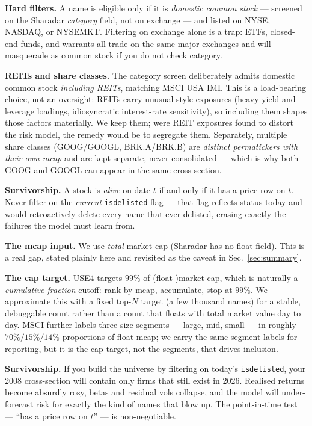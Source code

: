 \documentclass[11pt]{article}
\theoremstyle{definition}
\theoremstyle{plain}
\theoremstyle{remark}
\begin{document}
\textbf{Hard filters.} A name is eligible only if it is \emph{domestic common stock} --- screened on the Sharadar \emph{category} field, not on exchange --- and listed on NYSE, NASDAQ, or NYSEMKT. Filtering on exchange alone is a trap: ETFs, closed-end funds, and warrants all trade on the same major exchanges and will masquerade as common stock if you do not check category.

\textbf{REITs and share classes.} The category screen deliberately admits domestic common stock \emph{including REITs}, matching MSCI USA IMI. This is a load-bearing choice, not an oversight: REITs carry unusual style exposures (heavy yield and leverage loadings, idiosyncratic interest-rate sensitivity), so including them shapes those factors materially. We keep them; were REIT exposures found to distort the risk model, the remedy would be to segregate them. Separately, multiple share classes (GOOG/GOOGL, BRK.A/BRK.B) are \emph{distinct permatickers with their own mcap} and are kept separate, never consolidated --- which is why both GOOG and GOOGL can appear in the same cross-section.

\textbf{Survivorship.} A stock is \emph{alive} on date $t$ if and only if it has a price row on $t$. Never filter on the \emph{current} \texttt{isdelisted} flag --- that flag reflects status today and would retroactively delete every name that ever delisted, erasing exactly the failures the model must learn from.

\textbf{The mcap input.} We use \emph{total} market cap (Sharadar has no float field). This is a real gap, stated plainly here and revisited as the caveat in Sec.\ \ref{sec:summary}.

\textbf{The cap target.} USE4 targets $99\%$ of (float-)market cap, which is naturally a \emph{cumulative-fraction} cutoff: rank by mcap, accumulate, stop at $99\%$. We approximate this with a fixed top-$N$ target (a few thousand names) for a stable, debuggable count rather than a count that floats with total market value day to day. MSCI further labels three size segments --- large, mid, small --- in roughly $70\%/15\%/14\%$ proportions of float mcap; we carry the same segment labels for reporting, but it is the cap target, not the segments, that drives inclusion.

\begin{pitfall}
\textbf{Survivorship.} If you build the universe by filtering on today's \texttt{isdelisted}, your 2008 cross-section will contain only firms that still exist in 2026. Realised returns become absurdly rosy, betas and residual vols collapse, and the model will under-forecast risk for exactly the kind of names that blow up. The point-in-time test --- ``has a price row on $t$'' --- is non-negotiable.
\end{pitfall}
\end{document}
